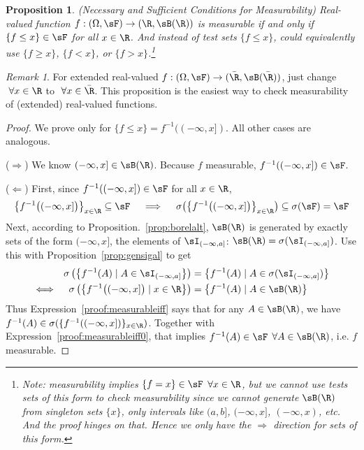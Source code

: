 \documentclass[12pt]{article}
\theoremstyle{plain}
\newtheorem{prop}[thm]{Proposition}
\theoremstyle{definition}
\theoremstyle{remark}
\newtheorem*{rmk}{Remark}
\newcommand{\ra}{\rightarrow}
\begin{document}
\begin{prop}
\label{prop:measurableiff}
\emph{(Necessary and Sufficient Conditions for Measurability)}
Real-valued function $f:(\Omega,\sF)\ra(\R,\sB(\R))$ is measurable if
and only if $\{f\leq x\}\in\sF$ for all $x\in\R$.
And instead of test sets $\{f\leq x\}$, could equivalently use
$\{f\geq x\}$,
$\{f<x\}$, or
$\{f>x\}$.\footnote{
  Note: measurability \emph{implies} $\{f=x\}\in\sF$ $\forall x\in\R$,
  but we cannot use tests sets of this form to \emph{check}
  measurability since we cannot generate $\sB(\R)$ from singleton sets
  $\{x\}$, only intervals like $(a,b]$, $(-\infty,x]$, $(-\infty,x)$, etc.
  And the proof hinges on that.
  Hence we only have the $\Rightarrow$ direction for sets of this form.
}
\end{prop}
\begin{rmk}
For extended real-valued
$f:(\Omega,\sF)\ra(\bar{\R},\sB(\bar{\R}))$,
just change $\;\forall x \in\R$ to $\;\forall x\in\bar{\R}$.
This proposition is the easiest way to check measurability of (extended)
real-valued functions.
\end{rmk}
\begin{proof}
We prove only for $\{f\leq x\}=f^{-1}((-\infty,x])$.
All other cases are analogous.

($\Rightarrow$)
We know $(-\infty,x]\in\sB(\R)$.
Because $f$ measurable, $f^{-1}((-\infty,x])\in\sF$.

($\Leftarrow$)
First, since $f^{-1}( (-\infty,x])\in\sF$ for all $x\in\R$,
\begin{align}
  \big\{f^{-1}\big( (-\infty,x]\big)\big\}_{x\in\R}
  \subseteq \sF
  \quad\implies\quad
  \sigma\big( \big\{f^{-1}\big( (-\infty,x] \big)\big\}_{x\in\R} \big)
  \subseteq \sigma(\sF)=\sF
  \label{proof:measurableiff0}
\end{align}
Next, according to Proposition.~\ref{prop:borelalt}, $\sB(\R)$ is
generated by exactly sets of the form $(-\infty,x]$, the elements of
$\sI_{(-\infty,a]}$: $\sB(\R)=\sigma(\sI_{(-\infty,a]})$.
Use this with Proposition~\ref{prop:gensigal} to get
\begin{align}
  \sigma\left( \left\{ f^{-1}(A) \;|\; A\in \sI_{(-\infty,a]}\right\} \right)
  &=
  \left\{ f^{-1}(A) \;|\;
  A\in\sigma(\sI_{(-\infty,a]})\right\}
  \notag
  \\
  \iff\quad
  \sigma\left( \left\{ f^{-1}\big((-\infty,x]\big) \;|\; x\in\R\right\} \right)
  &=
  \left\{ f^{-1}(A) \;|\;
  A\in\sB(\R)\right\}
  \label{proof:measurableiff}
\end{align}
Thus Expression~\ref{proof:measurableiff} says that for any
$A\in\sB(\R)$, we have $f^{-1}(A)\in
\sigma( \{f^{-1}( (-\infty,x] )\}_{x\in\R} )$.
Together with Expression~\ref{proof:measurableiff0}, that implies
$f^{-1}(A)\in\sF$ $\forall A\in\sB(\R)$, i.e. $f$ measurable.
\end{proof}
\end{document}
